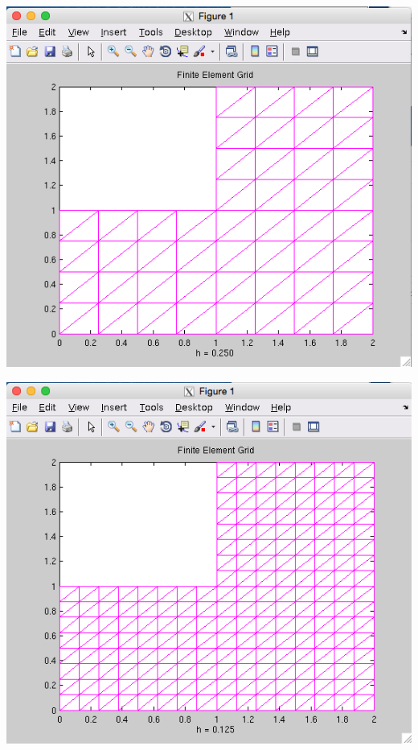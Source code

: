 \documentclass[11pt, oneside]{article}   	%
\begin{document}
\centerline{\includegraphics[scale = 0.55]{Grid_h2.png}}

\vspace{5mm}

\centerline{\includegraphics[scale = 0.55]{Grid_h3.png}}

\vspace{5mm}
\end{document}
